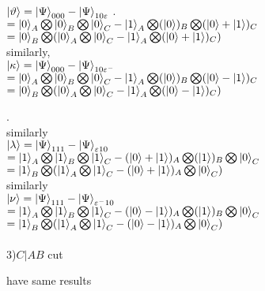 \documentclass[a4paper,12pt]{article}
\begin{document}
 	$ \ket{\vartheta} = \ket{\Psi}_{000}-\ket{\Psi}_{10\varepsilon}$
 	.\newline \\
 	$ = \ket{0}_{A}\bigotimes \ket{0}_{B}\bigotimes\ket{0}_{C} -\ket{1}_{A}\bigotimes (\ket{0})_{B}\bigotimes(\ket{0}+\ket{1})_{C}$
 	\newline \\
 	$ = \ket{0}_{B}\bigotimes(\ket{0}_{A}\bigotimes\ket{0}_{C}-\ket{1}_{A}\bigotimes(\ket{0}+\ket{1})_{C})$
 	\newline \\
 	similarly,
 	\newline  \\
 	$ \ket{\kappa}= \ket{\Psi}_{000}-\ket{\Psi}_{10\varepsilon^{-}} $
 	\newline \\
 	$ =\ket{0}_{A}\bigotimes \ket{0}_{B}\bigotimes\ket{0}_{C}- \ket{1}_{A}\bigotimes (\ket{0})_{B}\bigotimes(\ket{0}-\ket{1})_{C}$
 	\newline \\
 	$ =\ket{0}_{B}\bigotimes(\ket{0}_{A}\bigotimes\ket{0}_{C}-\ket{1}_{A}\bigotimes(\ket{0}-\ket{1})_{C}) $
 	
 	.\newline \\
 	similarly
 	\newline \\
 	$ \ket{\lambda} =\ket{\Psi}_{111} - \ket{\Psi}_{\varepsilon10}$
 	\newline\\
 	
 	$ =\ket{1}_{A}\bigotimes \ket{1}_{B}\bigotimes\ket{1}_{C}- (\ket{0}+\ket{1})_{A}\bigotimes (\ket{1})_{B}\bigotimes\ket{0}_{C}$
 	\newline\\
 	$ =\ket{1}_{B} \bigotimes(\ket{1}_{A}\bigotimes\ket{1}_{C}-(\ket{0}+\ket{1})_{A}\bigotimes\ket{0}_{C})$
 	\newline \\
 	similarly
 	\newline \\
 	$ \ket{\nu} =\ket{\Psi}_{111} -  \ket{\Psi}_{\varepsilon^{-} 10}$
 	\newline \\
 	$ =\ket{1}_{A}\bigotimes \ket{1}_{B}\bigotimes\ket{1}_{C}- (\ket{0}-\ket{1})_{A}\bigotimes (\ket{1})_{B}\bigotimes\ket{0}_{C}$
 		\newline\\
 	$ =\ket{1}_{B} \bigotimes(\ket{1}_{A}\bigotimes\ket{1}_{C}-(\ket{0}-\ket{1})_{A}\bigotimes\ket{0}_{C})$
 	\newline \\
 	\newline\\
 	
 	3)$C|AB$ cut
 	
 	have same results
 	
\end{document}
